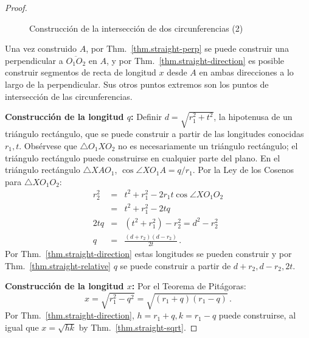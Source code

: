 \begin{proof}
\begin{figure}[b]
\begin{center}
\end{center}
\caption{Construcción de la intersección de dos circunferencias (2)}\label{f.se-circle-circle2}
\end{figure}

Una vez construido $A$, por Thm.~\ref{thm.straight-perp} se puede construir una perpendicular a $\overline{O_1O_2}$ en $A$, y por Thm.~\ref{thm.straight-direction} es posible construir segmentos de recta de longitud $x$ desde $A$ en ambas direcciones a lo largo de la perpendicular. Sus otros puntos extremos son los puntos de intersección de las circunferencias.

\noindent\textbf{Construcción de la longitud $q$:} Definir $d=\sqrt{r_1^2+t^2}$, la hipotenusa de un triángulo rectángulo, que se puede construir a partir de las longitudes conocidas $r_1,t$. Obsérvese que $\triangle O_1XO_2$ no es necesariamente un triángulo rectángulo; el triángulo rectángulo puede construirse en cualquier parte del plano. En el triángulo rectángulo $\triangle XAO_1$, $\cos\angle XO_1A=q/r_1$. Por la Ley de los Cosenos para $\triangle XO_1O_2$:
\begin{eqnarray*}
r_2^2 &=& t^2 + r_1^2 - 2r_1t\cos\angle XO_1O_2\\
&=& t^2 + r_1^2 - 2tq\\
2tq &=& (t^2+r_1^2) - r_2^2=d^2-r_2^2\\
q&=&\frac{(d+r_2)(d-r_2)}{2t}\,.
\end{eqnarray*}
Por Thm.~\ref{thm.straight-direction} estas longitudes se pueden construir y por Thm.~\ref{thm.straight-relative} $q$ se puede construir a partir de $d+r_2,d-r_2,2t$.

\noindent\textbf{Construcción de la longitud $x$:} Por el Teorema de Pitágoras:
\[
x=\sqrt{r_1^2-q^2}=\sqrt{(r_1+q)(r_1-q)}\,.
\]
Por Thm.~\ref{thm.straight-direction}, $h =r_1+ q,k= r_1 - q$ puede construirse, al igual que $x=\sqrt{hk}$ by Thm.~\ref{thm.straight-sqrt}.
\end{proof}

